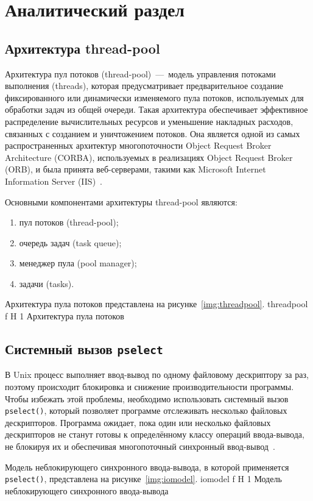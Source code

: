 \chapter{Аналитический раздел} 

\section{Архитектура thread-pool}

Архитектура пул потоков (thread-pool)~---~модель управления потоками выполнения (threads), которая предусматривает предварительное создание фиксированного или динамически изменяемого пула потоков, используемых для обработки задач из общей очереди.
Такая архитектура обеспечивает эффективное распределение вычислительных ресурсов и уменьшение накладных расходов, связанных с созданием и уничтожением потоков.
Она является одной из самых распространенных архитектур многопоточности Object Request Broker Architecture (CORBA), используемых в реализациях Object Request Broker (ORB), и была принята веб-серверами, такими как Microsoft Internet Information Server (IIS)~\cite{tp}.

Основными компонентами архитектуры thread-pool являются:
\begin{enumerate}
	\item пул потоков (thread-pool);
	\item очередь задач (task queue);
	\item менеджер пула (pool manager);
	\item задачи (tasks).
\end{enumerate}

\clearpage
Архитектура пула потоков представлена на рисунке~\ref{img:threadpool}.
	{threadpool}
	{f}
	{H}
	{1\textwidth}
	{Архитектура пула потоков}

\section{Системный вызов \texttt{pselect}}

В Unix процесс выполняет ввод-вывод по одному файловому дескриптору за раз, поэтому происходит блокировка и снижение производительности программы.
Чтобы избежать этой проблемы, необходимо использовать системный вызов \texttt{pselect()}, который позволяет программе отслеживать несколько файловых дескрипторов.
Программа ожидает, пока один или несколько файловых дескрипторов не станут готовы к определённому классу операций ввода-вывода, не блокируя их и обеспечивая многопоточный синхронный ввод-вывод~\cite{pselect}.

\clearpage
Модель неблокирующего синхронного ввода-вывода, в которой применяется \texttt{pselect()}, представлена на рисунке~\ref{img:iomodel}.
	{iomodel}
	{f}
	{H}
	{1\textwidth}
	{Модель неблокирующего синхронного ввода-вывода}